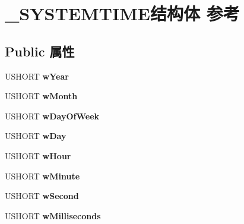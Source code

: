\hypertarget{struct___s_y_s_t_e_m_t_i_m_e}{}\section{\+\_\+\+S\+Y\+S\+T\+E\+M\+T\+I\+M\+E结构体 参考}
\label{struct___s_y_s_t_e_m_t_i_m_e}
\subsection*{Public 属性}
\begin{DoxyCompactItemize}
\item 
\mbox{\label{struct___s_y_s_t_e_m_t_i_m_e_a06ed33a1656389cceffcfb2f05d250ae}} 
U\+S\+H\+O\+RT {\bfseries w\+Year}
\item 
\mbox{\label{struct___s_y_s_t_e_m_t_i_m_e_a773fd89ec4a08997a0944cee8a3e41bf}} 
U\+S\+H\+O\+RT {\bfseries w\+Month}
\item 
\mbox{\label{struct___s_y_s_t_e_m_t_i_m_e_af3160b42a89d9ce648f97fc6d178743f}} 
U\+S\+H\+O\+RT {\bfseries w\+Day\+Of\+Week}
\item 
\mbox{\label{struct___s_y_s_t_e_m_t_i_m_e_aee7ad267ed9d9ed1581ddd4ad37b6055}} 
U\+S\+H\+O\+RT {\bfseries w\+Day}
\item 
\mbox{\label{struct___s_y_s_t_e_m_t_i_m_e_a8661dc983347452db670a2a92ffebb67}} 
U\+S\+H\+O\+RT {\bfseries w\+Hour}
\item 
\mbox{\label{struct___s_y_s_t_e_m_t_i_m_e_ab5eefa38099851abfd25436491d2b639}} 
U\+S\+H\+O\+RT {\bfseries w\+Minute}
\item 
\mbox{\label{struct___s_y_s_t_e_m_t_i_m_e_a8c9567e77fcdc10d9a1f7d687c8c5f7d}} 
U\+S\+H\+O\+RT {\bfseries w\+Second}
\item 
\mbox{\label{struct___s_y_s_t_e_m_t_i_m_e_a3204cab99283c838ccd126efeef30976}} 
U\+S\+H\+O\+RT {\bfseries w\+Milliseconds}
\item 
\mbox{\label{struct___s_y_s_t_e_m_t_i_m_e_a06ed33a1656389cceffcfb2f05d250ae}} 

\end{DoxyCompactItemize}
